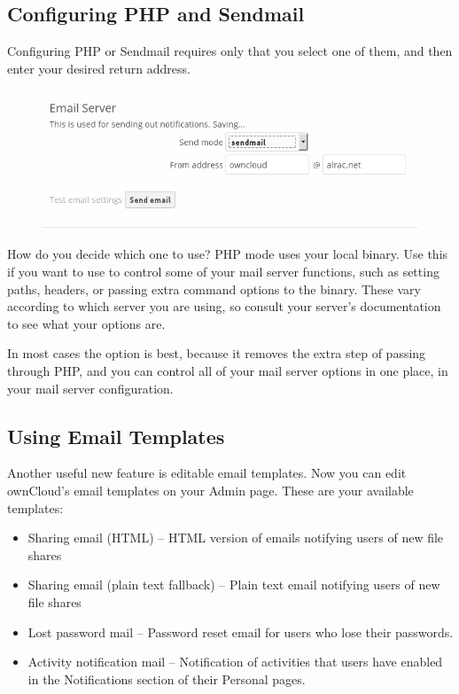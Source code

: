 \documentclass[letterpaper,10pt,english]{sphinxmanual}
\begin{document}
\subsection{Configuring PHP and Sendmail}
\label{configuration_server/email_configuration:configuring-php-and-sendmail}
Configuring PHP or Sendmail requires only that you select one of them, and then
enter your desired return address.
\begin{figure}[htbp]
\centering

\includegraphics{smtp-config-php-sendmail.png}
\end{figure}

How do you decide which one to use? PHP mode uses your local 
binary. Use this if you want to use  to control some of your mail
server functions, such as setting paths, headers, or passing extra command
options to the  binary. These vary according to which server you
are using, so consult your server's documentation to see what your options are.

In most cases the  option is best, because it removes the extra step of
passing through PHP, and you can control all of your mail server options in one
place, in your mail server configuration.


\subsection{Using Email Templates}
\label{configuration_server/email_configuration:using-email-templates}
Another useful new feature is editable email templates. Now you can edit
ownCloud's email templates on your Admin page. These are your available
templates:
\begin{itemize}
\item {} 
Sharing email (HTML) -- HTML version of emails notifying users of new file
shares

\item {} 
Sharing email  (plain text fallback) -- Plain text email notifying users of new file shares

\item {} 
Lost password mail -- Password reset email for users who lose their passwords.

\item {} 
Activity notification mail -- Notification of activities that users have
enabled in the Notifications section of their Personal pages.

\end{itemize}
\end{document}
